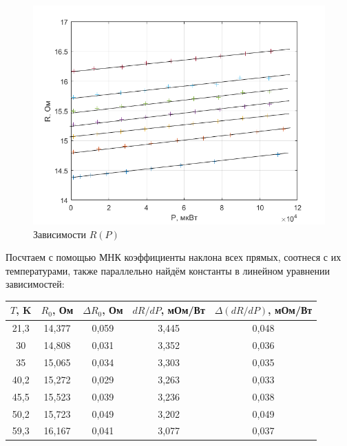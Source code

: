 \documentclass[a4paper, 12pt]{article} %
\begin{document}
\begin{figure}[!h]
    \centering
    \includegraphics[width = 13 cm]{RQ.png}
    \caption{Зависимости $R(P)$}
    \label{fig:vac}
\end{figure}

Посчтаем с помощью МНК коэффициенты наклона всех прямых, соотнеся с их температурами, также параллельно найдём константы в линейном уравнении зависимостей:

\begin{center}
\begin{tabular}{|c|c|c|c|c|}
\hline
$T$, K & $R_\text{0}$, Ом & $\Delta R_\text{0}$, Ом & $dR/dP$, мОм/Вт & $\Delta \left( dR/dP \right)$, мОм/Вт \\ \hline
21,3   & 14,377           & 0,059                   & 3,445                 & 0,048                                       \\ \hline
30     & 14,808           & 0,031                   & 3,352                 & 0,036                                       \\ \hline
35     & 15,065           & 0,034                   & 3,303                 & 0,035                                       \\ \hline
40,2   & 15,272           & 0,029                   & 3,263                 & 0,033                                       \\ \hline
45,5   & 15,523           & 0,039                   & 3,236                 & 0,038                                       \\ \hline
50,2   & 15,723           & 0,049                   & 3,202                & 0,049                                       \\ \hline
59,3   & 16,167           & 0,041                   & 3,077                 & 0,037                                       \\ \hline
\end{tabular}
\end{center}
\end{document}
